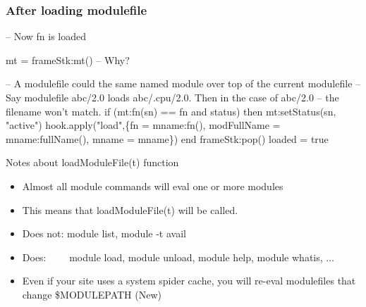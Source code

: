 \documentclass{beamer}
\begin{document}
\begin{frame}[fragile]
    \frametitle{After loading modulefile}
 {\tiny
    \begin{semiverbatim}
     -- Now fn is loaded 

     mt = frameStk:mt() -- Why?

     -- A modulefile could the same named module over top of the current modulefile
     -- Say modulefile abc/2.0 loads abc/.cpu/2.0.  Then in the case of abc/2.0
     -- the filename won't match.
     if (mt:fn(sn) == fn and status) then
        mt:setStatus(sn, "active")
        hook.apply("load",\{fn = mname:fn(), modFullName =
                   mname:fullName(), mname = mname\})
     end
     frameStk:pop()
     loaded = true
    \end{semiverbatim}
}
\end{frame}

\begin{frame}{Notes about loadModuleFile(t) function}
  \begin{itemize}
    \item Almost all module commands will eval one or more modules
    \item This means that loadModuleFile(t) will be called.
    \item Does not: module list, module -t avail
    \item Does: ~~~~module load, module unload, module help, module whatis, ...
    \item Even if your site uses a system spider cache, you will re-eval modulefiles that change \$MODULEPATH (New)
  \end{itemize}
\end{frame}
\end{document}
